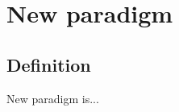 \documentclass[a4paper,10pt]{article}
\begin{document}





\section{New paradigm}
\subsection{Definition}
New paradigm is...
\end{document}
